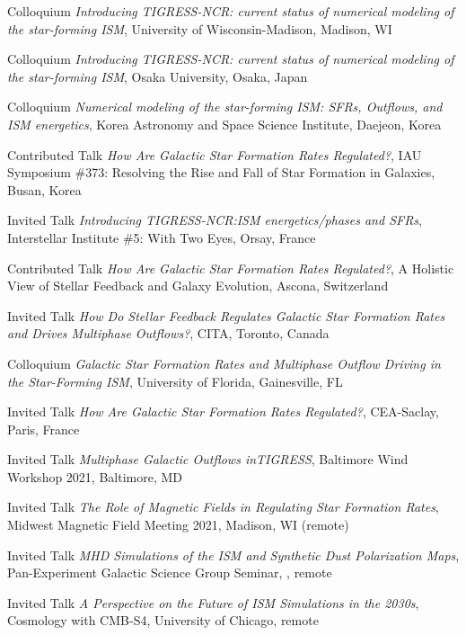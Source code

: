 \documentclass[12pt]{article}
\begin{document}
{Colloquium}
{\emph{Introducing TIGRESS-NCR: current status of numerical modeling of the star-forming ISM},
University of Wisconsin-Madison,
Madison, WI}

{Colloquium}
{\emph{Introducing TIGRESS-NCR: current status of numerical modeling of the star-forming ISM},
Osaka University,
Osaka, Japan}

{Colloquium}
{\emph{Numerical modeling of the star-forming ISM:  SFRs, Outflows, and ISM energetics},
Korea Astronomy and Space Science Institute,
Daejeon, Korea}

{Contributed Talk}
{\emph{How Are Galactic Star Formation Rates Regulated?},
IAU Symposium \#373: Resolving the Rise and Fall of Star Formation in Galaxies,
Busan, Korea}

{Invited Talk}
{\emph{Introducing TIGRESS-NCR:ISM energetics/phases and SFRs},
Interstellar Institute \#5: With Two Eyes,
Orsay, France}

{Contributed Talk}
{\emph{How Are Galactic Star Formation Rates Regulated?},
A Holistic View of Stellar Feedback and Galaxy Evolution,
Ascona, Switzerland}

{Invited Talk}
{\emph{How Do Stellar Feedback Regulates Galactic Star Formation Rates and Drives Multiphase Outflows?},
CITA,
Toronto, Canada}

{Colloquium}
{\emph{Galactic Star Formation Rates and Multiphase Outflow Driving in the Star-Forming ISM},
University of Florida,
Gainesville, FL}

{Invited Talk}
{\emph{How Are Galactic Star Formation Rates Regulated?},
CEA-Saclay,
Paris, France}

{Invited Talk}
{\emph{Multiphase Galactic Outflows inTIGRESS},
Baltimore Wind Workshop 2021,
Baltimore, MD}

{Invited Talk}
{\emph{The Role of Magnetic Fields in Regulating Star Formation Rates},
Midwest Magnetic Field Meeting 2021,
Madison, WI (remote)}

{Invited Talk}
{\emph{MHD Simulations of the ISM and Synthetic Dust Polarization Maps},
Pan-Experiment Galactic Science Group Seminar,
\href{https://galsci.github.io}, remote}

{Invited Talk}
{\emph{A Perspective on the Future of ISM Simulations in the 2030s},
Cosmology with CMB-S4,
University of Chicago, remote}
\end{document}
